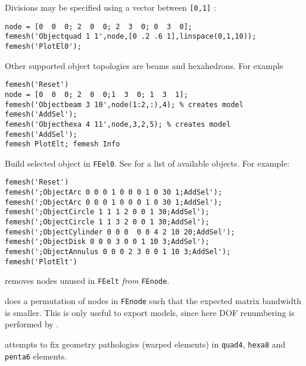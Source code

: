 Divisions may be specified using a vector between {\tt [0,1]} :
\begin{verbatim}
node = [0  0  0; 2  0  0; 2  3  0; 0  3  0];
femesh('Objectquad 1 1',node,[0 .2 .6 1],linspace(0,1,10)); 
femesh('PlotEl0');
\end{verbatim}%


Other supported object topologies are beams and hexahedrons. For example
\begin{verbatim}
femesh('Reset')
node = [0  0  0; 2  0  0;1  3  0; 1  3  1];
femesh('Objectbeam 3 10',node(1:2,:),4); % creates model
femesh('AddSel');
femesh('Objecthexa 4 11',node,3,2,5); % creates model 
femesh('AddSel');
femesh PlotElt; femesh Info
\end{verbatim}%



Build selected object in {\tt FEel0}. See  for a list of available objects. For example:

\begin{verbatim}
femesh('Reset')
femesh(';ObjectArc 0 0 0 1 0 0 0 1 0 30 1;AddSel');
femesh(';ObjectArc 0 0 0 1 0 0 0 1 0 30 1;AddSel');
femesh(';ObjectCircle 1 1 1 2 0 0 1 30;AddSel');
femesh(';ObjectCircle 1 1 3 2 0 0 1 30;AddSel');
femesh(';ObjectCylinder 0 0 0  0 0 4 2 10 20;AddSel');
femesh(';ObjectDisk 0 0 0 3 0 0 1 10 3;AddSel');
femesh(';ObjectAnnulus 0 0 0 2 3 0 0 1 10 3;AddSel');
femesh('PlotElt')
\end{verbatim}%


\noindent {} removes nodes unused in {\tt FEelt} {\sl from} {\tt FEnode}.

 does a permutation of nodes in {\tt FEnode} such that the expected matrix bandwidth is smaller. This is only useful to export models, since here DOF renumbering is performed by \femk.

 attempts to fix geometry pathologies (warped elements) in {\tt quad4}, {\tt hexa8} and {\tt penta6} elements.


